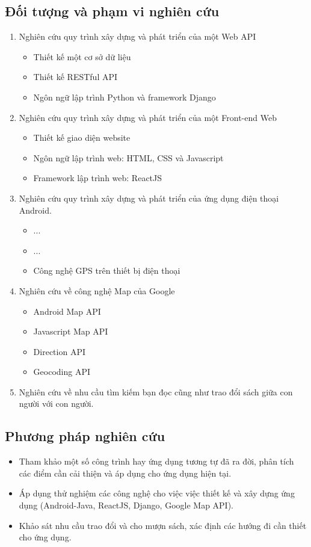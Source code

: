 \documentclass[../thesis.tex]{subfiles}
\begin{document}
	\subsection{Đối tượng và phạm vi nghiên cứu}
	\begin{enumerate}
		\item Nghiên cứu quy trình xây dựng và phát triển của một Web API
		\begin{itemize}			
			\item Thiết kế một cơ sở dữ liệu
			\item Thiết kế RESTful API
			\item Ngôn ngữ lập trình Python và framework Django
		\end{itemize}
	
		\item Nghiên cứu quy trình xây dựng và phát triển của một Front-end Web
		\begin{itemize}
			\item Thiết kế giao diện website
			\item Ngôn ngữ lập trình web: HTML, CSS và Javascript
			\item Framework lập trình web: ReactJS
		\end{itemize}
	
		\item Nghiên cứu quy trình xây dựng và phát triển của ứng dụng điện thoại Android.
		\begin{itemize}
			\item ...
			\item ...
			\item Công nghệ GPS trên thiết bị điện thoại
		\end{itemize}
	
		\item Nghiên cứu về công nghệ Map của Google
		\begin{itemize}
			\item Android Map API
			\item Javascript Map API
			\item Direction API
			\item Geocoding API
		\end{itemize}
	
		\item Nghiên cứu về nhu cầu tìm kiếm bạn đọc cũng như trao đổi sách giữa con người với con người.
	\end{enumerate}	

	\subsection{Phương pháp nghiên cứu}
	\begin{itemize}
		\item Tham khảo một số công trình hay ứng dụng tương tự đã ra đời, phân tích các điểm cần cải thiện và áp dụng cho ứng dụng hiện tại.
		\item Áp dụng thử nghiệm các công nghệ cho việc việc thiết kế và xây dựng ứng dụng (Android-Java, ReactJS, Django, Google Map API).
		\item Khảo sát nhu cầu trao đổi và cho mượn sách, xác định các hướng đi cần thiết cho ứng dụng.
	\end{itemize}
	
\end{document}
